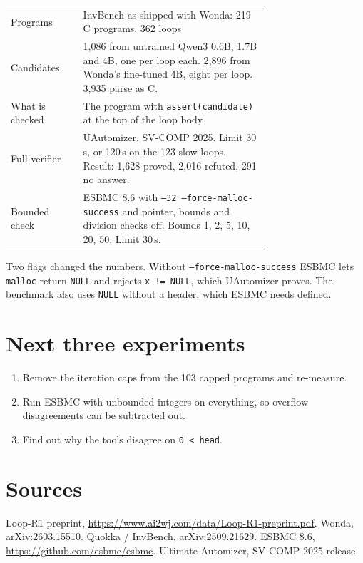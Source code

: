 \documentclass[11pt]{article}
\newcommand{\code}[1]{\texttt{#1}}
\begin{document}
\begin{center}
\begin{tabular}{lp{0.72\linewidth}}
\toprule
Programs & InvBench as shipped with Wonda: 219 C programs, 362 loops \\
Candidates & 1{,}086 from untrained Qwen3 0.6B, 1.7B and 4B, one per loop each. 2{,}896 from
Wonda's fine-tuned 4B, eight per loop. 3{,}935 parse as C. \\
What is checked & The program with \code{assert(candidate)} at the top of the loop body \\
Full verifier & UAutomizer, SV-COMP 2025. Limit 30\,s, or 120\,s on the 123 slow loops.
Result: 1{,}628 proved, 2{,}016 refuted, 291 no answer. \\
Bounded check & ESBMC 8.6 with \code{--32 --force-malloc-success} and pointer, bounds and
division checks off. Bounds 1, 2, 5, 10, 20, 50. Limit 30\,s. \\
\bottomrule
\end{tabular}
\end{center}

\noindent Two flags changed the numbers. Without \code{--force-malloc-success} ESBMC lets
\code{malloc} return \code{NULL} and rejects \code{x != NULL}, which UAutomizer proves. The
benchmark also uses \code{NULL} without a header, which ESBMC needs defined.

\section{Next three experiments}

\begin{enumerate}
\item Remove the iteration caps from the 103 capped programs and re-measure.
\item Run ESBMC with unbounded integers on everything, so overflow disagreements can be
subtracted out.
\item Find out why the tools disagree on \code{0 < head}.
\end{enumerate}

\section*{Sources}

Loop-R1 preprint, \url{https://www.ai2wj.com/data/Loop-R1-preprint.pdf}. Wonda,
arXiv:2603.15510. Quokka / InvBench, arXiv:2509.21629. ESBMC 8.6,
\url{https://github.com/esbmc/esbmc}. Ultimate Automizer, SV-COMP 2025 release.
\end{document}
